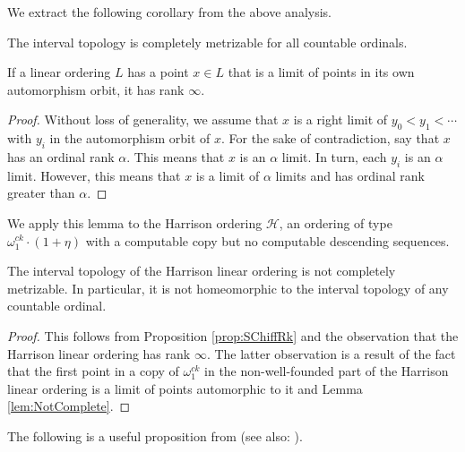 \documentclass[11pt]{amsart}
\def\H{\mathcal H}
\theoremstyle{remark}
\begin{document}
We extract the following corollary from the above analysis.

\begin{corollary}\label{cor:ordMet}
The interval topology is completely metrizable for all countable ordinals.
\end{corollary}

\begin{lemma}\label{lem:NotComplete}
If a linear ordering $L$ has a point  $x\in L$ that is a limit of points in its own automorphism orbit, it has rank $\infty$.
\end{lemma}

\begin{proof}
Without loss of generality, we assume that $x$ is a right limit of $y_0<y_1<\cdots$ with $y_i$ in the automorphism orbit of $x$.
For the sake of contradiction, say that $x$ has an ordinal rank $\alpha$.
This means that $x$ is an $\alpha$ limit.
In turn, each $y_i$ is an $\alpha$ limit.
However, this means that $x$ is a limit of $\alpha$ limits and has ordinal rank greater than $\alpha$.
\end{proof}

We apply this lemma to the Harrison ordering $\H$, an ordering of type $\omega_1^{ck}\cdot(1+\eta)$ with a computable copy but no computable descending sequences.

\begin{corollary}\label{cor:notHomeo}
The interval topology of the Harrison linear ordering is not completely metrizable.
In particular, it is not homeomorphic to the interval topology of any countable ordinal.
\end{corollary}

\begin{proof}
This follows from Proposition \ref{prop:SChiffRk} and the observation that the Harrison linear ordering has rank $\infty$.
The latter observation is a result of the fact that the first point in a copy of $\omega_1^{ck}$ in the non-well-founded part of the Harrison linear ordering is a limit of points automorphic to it and Lemma \ref{lem:NotComplete}.
\end{proof}

The following is a useful proposition from \cite[Chapter XI]{MBook}  (see also: \cite{FFHKMM}).

\end{document}
